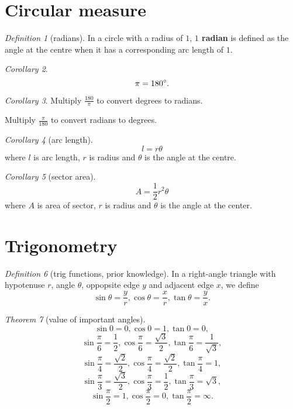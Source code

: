 \documentclass[8pt]{article}
\theoremstyle{remark}
\newtheorem{theorem}{Theorem}[section]
\newtheorem{corollary}[theorem]{Corollary}
\newtheorem{definition}[theorem]{Definition}
\begin{document}
    \section{Circular measure}
        \begin{definition}[radians]
            In a circle with a radius of $1$, \textbf{$1$ radian} is defined as the angle at the centre when it has a corresponding arc length of $1$.
        \end{definition}

        \begin{corollary}
            $$
                \pi = 180^\circ.
            $$
        \end{corollary}

        \begin{corollary}
            Multiply $\frac{180}{\pi}$ to convert degrees to radians.
            
            Multiply $\frac{\pi}{180}$ to convert radians to degrees.
        \end{corollary}

        \begin{corollary}[arc length]
            $$l = r \theta$$
            where $l$ is arc length, $r$ is radius and $\theta$ is the angle at the centre.
        \end{corollary}

        \begin{corollary}[sector area]
            $$A = \frac{1}{2} r^2 \theta$$
            where $A$ is area of sector, $r$ is radius and $\theta$ is the angle at the center.
        \end{corollary}

    \section{Trigonometry}
        
        \begin{definition}[trig functions, prior knowledge]
            In a right-angle triangle with hypotenuse $r$, angle $\theta$, oppopsite edge $y$ and adjacent edge $x$, we define
            $$
                \sin \theta = \frac{y}{r}, \cos \theta = \frac{x}{r}, \tan \theta = \frac{y}{x}.
            $$
        \end{definition}

        \begin{theorem}[value of important angles]
            $$\sin 0 = 0, \cos 0 = 1, \tan 0 = 0,$$
            $$\sin \frac{\pi}{6} = \frac{1}{2}, \cos \frac{\pi}{6} = \frac{\sqrt{3}}{2}, \tan \frac{\pi}{6} = \frac{1}{\sqrt{3}},$$
            $$\sin \frac{\pi}{4} = \frac{\sqrt{2}}{2}, \cos \frac{\pi}{4} = \frac{\sqrt{2}}{2}, \tan \frac{\pi}{4} = 1,$$
            $$\sin \frac{\pi}{3} = \frac{\sqrt{3}}{2}, \cos \frac{\pi}{3} = \frac{1}{2}, \tan \frac{\pi}{3} = \sqrt{3},$$
            $$\sin \frac{\pi}{2} = 1, \cos \frac{\pi}{2} = 0, \tan \frac{\pi}{2} = \infty.$$
        \end{theorem}
\end{document}
